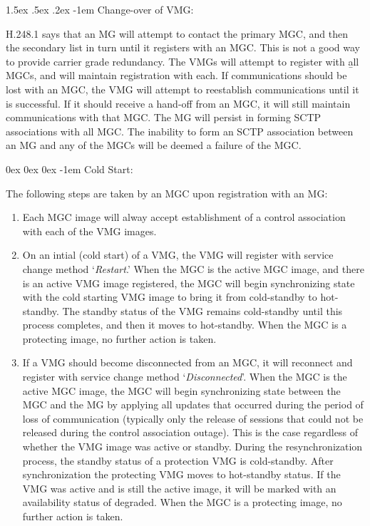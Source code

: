 \documentclass[letterpaper,final,notitlepage,twocolumn,10pt,twoside]{article}
\makeatletter
\let\normalsize = \small
\let\small = \footnotesize
\let\footnotesize = \scriptsize
\let\scriptsize = \tiny
\renewcommand\paragraph{\@startsection{paragraph}{4}{\z@}%
                                    {1.5ex \@plus .5ex \@minus .2ex}%
                                    {-1em}%
                                    {\normalfont\normalsize\bfseries\slshape}}
\renewcommand\subparagraph{\@startsection{subparagraph}{5}{\parindent}%
                                       {0ex \@plus 0ex \@minus 0ex}%
                                       {-1em}%
                                      {\normalfont\normalsize\bfseries\slshape}}
\makeatother
\begin{document}
\paragraph{Change-over of VMG:}

H.248.1\cite[]{H2481} says that an MG will attempt to contact the primary MGC,
and then the secondary list in turn until it registers with an MGC.  This is
not a good way to provide carrier grade redundancy.  The VMGs will attempt to
register with {\b all} MGCs, and will maintain registration with each.  If
communications should be lost with an MGC, the VMG will attempt to reestablish
communications until it is successful.  If it should receive a hand-off from
an MGC, it will still maintain communications with that MGC.  The MG will
persist in forming SCTP associations with all MGC.  The inability to form an
SCTP association between an MG and any of the MGCs will be deemed a failure of
the MGC.

\subparagraph{Cold Start:}

The following steps are taken by an MGC upon registration with an MG:

\begin{enumerate}

\item Each MGC image will alway accept establishment of a control association
with each of the VMG images.

\item On an intial (cold start) of a VMG, the  VMG will register with service
change method `{\it Restart}.'  When the MGC is the active MGC image, and there
is an active VMG image registered, the MGC will begin synchronizing state with
the cold starting VMG image to bring it from cold-standby to hot-standby.  The
standby status of the VMG remains cold-standby until this process completes,
and then it moves to hot-standby.  When the MGC is a protecting image, no
further action is taken.

\item If a VMG should become disconnected from an MGC, it will reconnect and
register with service change method `{\it Disconnected}'.  When the MGC is the
active MGC image, the MGC will begin synchronizing state between the MGC and
the MG by applying all updates that occurred during the period of loss of
communication (typically only the release of sessions that could not be
released during the control association outage).  This is the case regardless
of whether the VMG image was active or standby.  During the resynchronization
process, the standby status of a protection VMG is cold-standby.  After
synchronization the protecting VMG moves to hot-standby status.  If the VMG
was active and is still the active image, it will be marked with an
availability status of degraded.  When the MGC is a protecting image, no
further action is taken.

\end{enumerate}
\end{document}
